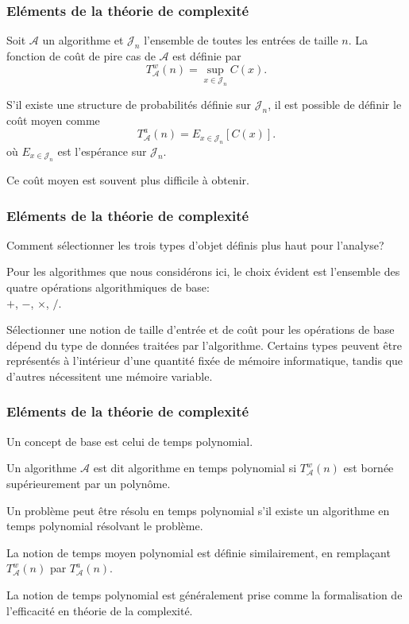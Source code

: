 \documentclass[t,usepdftitle=false]{beamer}
\begin{document}
\begin{frame}
\frametitle{Eléments de la théorie de complexité}

Soit $\mathcal{A}$ un algorithme et $\mathcal{J}_n$ l'ensemble de toutes les entrées de taille $n$. La fonction de coût de pire cas de $\mathcal{A}$ est définie par
\[
T^w_{\mathcal{A}}(n) = \sup_{x \in \mathcal{J}_n} C(x).
\]

\mbox{}

S'il existe une structure de probabilités définie sur $\mathcal{J}_n$, il est possible de définir le coût moyen comme
\[
T^a_{\mathcal{A}}(n) = E_{x \in \mathcal{J}_n} [C(x)].
\]
où $E_{x \in \mathcal{J}_n}$ est l'espérance sur $\mathcal{J}_n$.

\mbox{}

Ce coût moyen est souvent plus difficile à obtenir.

\end{frame}

\begin{frame}
\frametitle{Eléments de la théorie de complexité}

Comment sélectionner les trois types d'objet définis plus haut pour l'analyse?

\mbox{}

Pour les algorithmes que nous considérons ici, le choix évident est l'ensemble des quatre opérations algorithmiques de base:\\
$+$, $-$, $\times$, $/$.

\mbox{}

Sélectionner une notion de taille d'entrée et de coût pour les opérations de base dépend du type de données traitées par l'algorithme. Certains types peuvent être représentés à l'intérieur d'une quantité fixée de mémoire informatique, tandis que d'autres nécessitent une mémoire variable.

\end{frame}

\begin{frame}
\frametitle{Eléments de la théorie de complexité}

Un concept de base est celui de temps polynomial.

\mbox{}

Un algorithme $\mathcal{A}$ est dit algorithme en temps polynomial si $T_{\mathcal{A}}^w(n)$ est bornée supérieurement par un polynôme.

\mbox{}

Un problème peut être résolu en temps polynomial s'il existe un algorithme en temps polynomial résolvant le problème.

\mbox{}

La notion de temps moyen polynomial est définie similairement, en remplaçant $T_{\mathcal{A}}^w(n)$ par $T_{\mathcal{A}}^a(n)$.

\mbox{}

La notion de temps polynomial est généralement prise comme la formalisation de l'efficacité en théorie de la complexité.

\end{frame}
\end{document}
